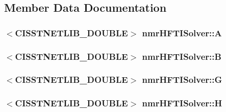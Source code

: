 \subsection{Member Data Documentation}
\hypertarget{classnmr_h_f_t_i_solver_a3bf7da50e30b56b35fa988819596c883}{
\subsubsection[{A}]{$<$C\-I\-S\-S\-T\-N\-E\-T\-L\-I\-B\-\_\-\-D\-O\-U\-B\-L\-E$>$ nmr\-H\-F\-T\-I\-Solver\-::\-A\hspace{0.3cm}{\ttfamily [protected]}}}\label{classnmr_h_f_t_i_solver_a3bf7da50e30b56b35fa988819596c883}
\hypertarget{classnmr_h_f_t_i_solver_a208b4bacf42c9d2b336f40a84f1f24b4}{
\subsubsection[{B}]{$<$C\-I\-S\-S\-T\-N\-E\-T\-L\-I\-B\-\_\-\-D\-O\-U\-B\-L\-E$>$ nmr\-H\-F\-T\-I\-Solver\-::\-B\hspace{0.3cm}{\ttfamily [protected]}}}\label{classnmr_h_f_t_i_solver_a208b4bacf42c9d2b336f40a84f1f24b4}
\hypertarget{classnmr_h_f_t_i_solver_a6b774e25595536c6c694d96dcef70587}{
\subsubsection[{G}]{$<$C\-I\-S\-S\-T\-N\-E\-T\-L\-I\-B\-\_\-\-D\-O\-U\-B\-L\-E$>$ nmr\-H\-F\-T\-I\-Solver\-::\-G\hspace{0.3cm}{\ttfamily [protected]}}}\label{classnmr_h_f_t_i_solver_a6b774e25595536c6c694d96dcef70587}
\hypertarget{classnmr_h_f_t_i_solver_a501a8290546e44496608d9c0cca2a550}{
\subsubsection[{H}]{$<$C\-I\-S\-S\-T\-N\-E\-T\-L\-I\-B\-\_\-\-D\-O\-U\-B\-L\-E$>$ nmr\-H\-F\-T\-I\-Solver\-::\-H\hspace{0.3cm}{\ttfamily [protected]}}}\label{classnmr_h_f_t_i_solver_a501a8290546e44496608d9c0cca2a550}
